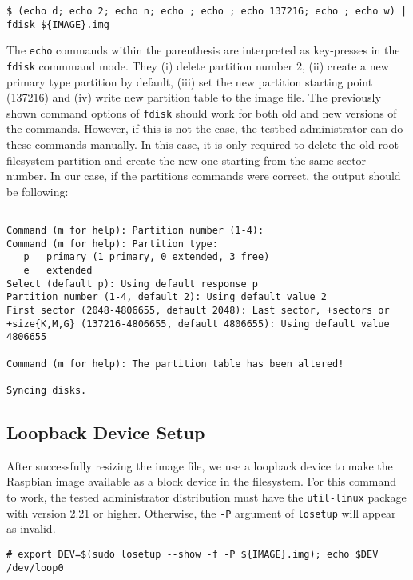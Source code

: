 \begin{lstlisting}[]
$ (echo d; echo 2; echo n; echo ; echo ; echo 137216; echo ; echo w) | fdisk ${IMAGE}.img
\end{lstlisting}
\FloatBarrier
\vspace{-5mm}

The \texttt{echo} commands within the parenthesis are interpreted as
key-presses in the \texttt{fdisk} commmand mode. They (i) delete partition
number 2, (ii) create a new primary type partition by default, (iii) set the
new partition starting point (137216) and (iv) write new partition table to
the image file. The previously shown command options of \texttt{fdisk}
should work for both old and new versions of the commands. However, if this
is not the case, the testbed administrator can do these commands manually.
In this case, it is only required to delete the old root
filesystem partition and create the new one starting from the same sector
number. In our case, if the partitions commands were correct, the output
should be following:

\begin{lstlisting}[]

Command (m for help): Partition number (1-4):
Command (m for help): Partition type:
   p   primary (1 primary, 0 extended, 3 free)
   e   extended
Select (default p): Using default response p
Partition number (1-4, default 2): Using default value 2
First sector (2048-4806655, default 2048): Last sector, +sectors or
+size{K,M,G} (137216-4806655, default 4806655): Using default value 4806655

Command (m for help): The partition table has been altered!

Syncing disks.

\end{lstlisting}
\FloatBarrier
\vspace{-5mm}

\subsection{Loopback Device Setup}
After successfully resizing the image file, we use a loopback device to make
the Raspbian image available as a block device in the filesystem. For this
command to work, the tested administrator distribution must have the
\texttt{util-linux} package with version 2.21 or higher. Otherwise, the
\texttt{-P} argument of \texttt{losetup} will appear as invalid.


\begin{lstlisting}[]
# export DEV=$(sudo losetup --show -f -P ${IMAGE}.img); echo $DEV
/dev/loop0
\end{lstlisting}
\FloatBarrier
\vspace{-5mm}

